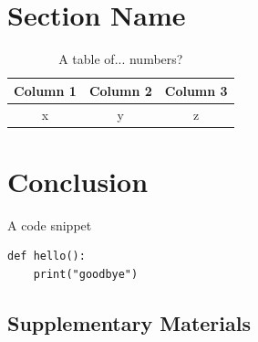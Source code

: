 \documentclass[a4paper,11pt]{article}
\begin{document}
\section{Section Name}

\begin{table}[h!]
    \centering
    \caption{A table of... numbers?}
    \label{tab:numbers?}
    \begin{tabular}{ccc}
        \toprule
        Column 1 & Column 2 & Column 3 \\ \midrule
        x & y & z \\
        \bottomrule
    \end{tabular}
\end{table}

\section{Conclusion}
\begin{listing}[h!]
    \caption{A code snippet}
    \label{code:bye}
    \begin{verbatim}
def hello():
    print("goodbye")
    \end{verbatim}
\end{listing}

\pagebreak
\printbibliography


\pagebreak
\begin{appendices}
    
\section{Supplementary Materials}
    
\end{appendices}
\end{document}
